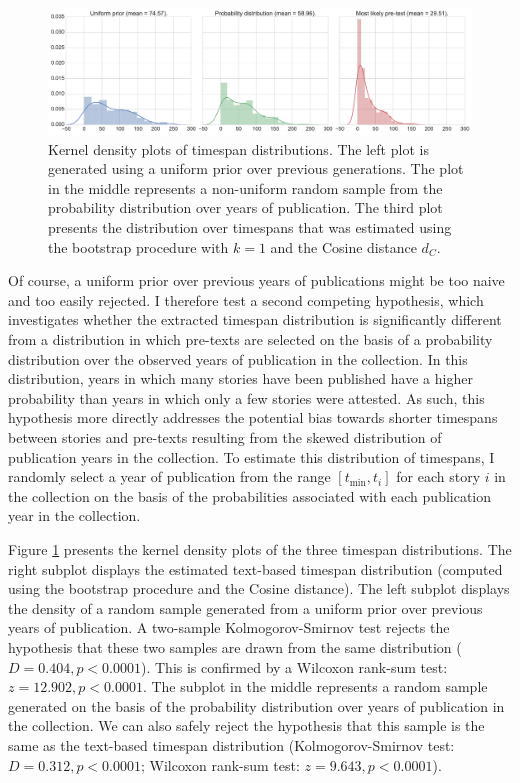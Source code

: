 \begin{figure}
\centering
\includegraphics[width=\textwidth]{images/distributions}
\caption{Kernel density plots of timespan distributions. The left plot is generated using a uniform prior over previous generations. The plot in the middle represents a non-uniform random sample from the probability distribution over years of publication. The third plot presents the distribution over timespans that was estimated using the bootstrap procedure with $k=1$ and the Cosine distance $d_C$.}
\label{fig:timespan-distribution}
\end{figure}

Of course, a uniform prior over previous years of publications might be too naive and too easily rejected. I therefore test a second competing hypothesis, which investigates whether the extracted timespan distribution is significantly different from a distribution in which pre-texts are selected on the basis of a probability distribution over the observed years of publication in the collection. In this distribution, years in which many stories have been published have a higher probability than years in which only a few stories were attested. As such, this hypothesis more directly addresses the potential bias towards shorter timespans between stories and pre-texts resulting from the skewed distribution of publication years in the collection. To estimate this distribution of timespans, I randomly select a year of publication from the range $[t_{\min}, t_i]$ for each story $i$ in the collection on the basis of the probabilities associated with each publication year in the collection. 

Figure \ref{fig:timespan-distribution} presents the kernel density plots of the three timespan distributions. The right subplot displays the estimated text-based timespan distribution (computed using the bootstrap procedure and the Cosine distance). The left subplot displays the density of a random sample generated from a uniform prior over previous years of publication. A two-sample Kolmogorov-Smirnov test rejects the hypothesis that these two samples are drawn from the same distribution ($D=0.404, p < 0.0001$). This is confirmed by a Wilcoxon rank-sum test: $z=12.902, p < 0.0001$. The subplot in the middle represents a random sample generated on the basis of the probability distribution over years of publication in the collection. We can also safely reject the hypothesis that this sample is the same as the text-based timespan distribution (Kolmogorov-Smirnov test: $D=0.312, p < 0.0001$; Wilcoxon rank-sum test: $z=9.643, p < 0.0001$). 

